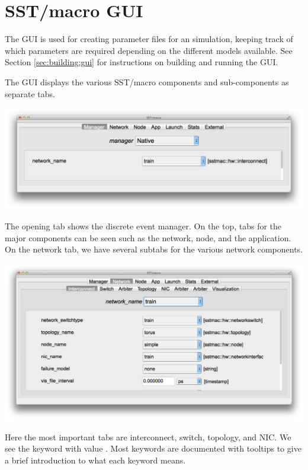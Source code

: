 
\section{SST/macro GUI}
\label{sec:basicgui}

The \sstmacro GUI is used for creating parameter files for an \sstmacro simulation, keeping track of which parameters are required
depending on the different models available.  See Section \ref{sec:building:gui} for instructions on building and running the GUI.


The GUI displays the various SST/macro components and sub-components as separate tabs.
\begin{center}
\includegraphics[width=1.0\textwidth]{figures/gui/manager.pdf}
\end{center}
The opening tab shows the discrete event manager. 
On the top, tabs for the major components can be seen such as the network, node, and the application.  
On the network tab, we have several subtabs for the various network components.
\begin{center}
\includegraphics[width=1.0\textwidth]{figures/gui/network.pdf}
\end{center}
Here the most important tabs are interconnect, switch, topology, and NIC.   
We see the keyword  with value .  
Most keywords are documented with tooltips to give a brief introduction to what each keyword means.
